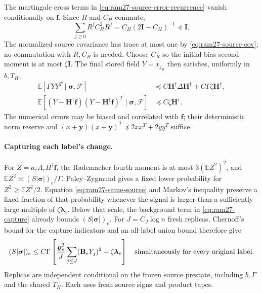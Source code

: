 \documentclass[11pt]{article}
\theoremstyle{remark}
\newcommand{\BB}{\mathbf B}
\newcommand{\II}{\mathbf I}
\newcommand{\HH}{\mathbf H}
\newcommand{\ff}{\mathbf f}
\newcommand{\llambda}{\boldsymbol{\lambda}}
\newcommand{\yy}{\mathbf y}
\newcommand{\vvr}{\boldsymbol{\varrho}}
\newcommand{\ssigma}{\boldsymbol{\sigma}}
\newcommand{\Ex}{\mathbb E}
\begin{document}
The martingale cross terms in \eqref{eq:ram27-source-error-recurrence} vanish
conditionally on $\ff$.
Since $R$ and $C_H$ commute,
\[
 \sum_{j\ge0}R^jC_H^2R^j
       =C_H(2\II-C_H)^{-1}\preceq \II .
\]
The normalized source covariance has trace at most one by
\eqref{eq:ram27-source-cov}; no commutation with $R,C_H$ is needed.
Choose $C_R$ so the initial-bias second moment is at most $\zeta \II$.
The final stored field $Y=x_{j_R}$ then satisfies, uniformly in $b,T_H$,
\begin{align}
 \Ex[\Gamma YY^T\mid\ssigma,\mathcal F]
   &\preceq C \HH^\dagger\Delta \HH^\dagger
              +C\Gamma\zeta \HH^\dagger ,
       \label{eq:ram27-raw}\\
 \Ex[(Y-\HH^\dagger \ff)(Y-\HH^\dagger \ff)^T
                                      \mid\ssigma,\mathcal F]
   &\preceq C\zeta \HH^\dagger . \label{eq:ram27-same-source}
\end{align}
The numerical errors may be biased and correlated with $\ff$; their deterministic
norm reserve and $(x+\yy)(x+\yy)^T\preceq2xx^T+2yy^T$ suffice.

\paragraph{Capturing each label's change.}
For $Z=a_eA_eH^\dagger \ff$, the Rademacher fourth moment is at most $3(\Ex
Z^2)^2$, and $\Ex Z^2\asymp (S|\ssigma|)_e/\Gamma$.
Paley--Zygmund gives a fixed lower probability for $Z^2\ge\Ex Z^2/2$.
Equation \eqref{eq:ram27-same-source} and Markov's inequality preserve a fixed
fraction of that probability whenever the signal is larger than a sufficiently
large multiple of $\zeta\llambda_e$.
Below that scale, the background term in \eqref{eq:ram27-capture} already bounds
$(S|\ssigma|)_e$.
For $J=C_J\log n$ fresh replicas, Chernoff's bound for the capture indicators and an
all-label union bound therefore give
\begin{equation}\label{eq:ram27-capture}
 (S|\ssigma|)_e\le C\Gamma\left[
       \frac{\vvr_e^2}{J}\sum_{j\le J}(\BB_eY_j)^2+
                                      \zeta\llambda_e\right]
 \quad\hbox{simultaneously for every original label}.
\end{equation}
Replicas are independent conditional on the frozen source prestate, including
$b,\Gamma$ and the shared $T_H$.
Each uses fresh source signs and product tapes.
\end{document}
